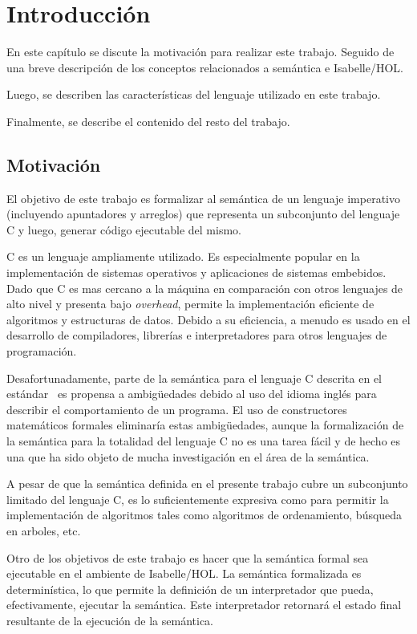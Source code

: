\chapter{Introducción}\label{chapter:introduction}

En este capítulo se discute la motivación para realizar este trabajo.
Seguido de una breve descripción de los conceptos relacionados a semántica e Isabelle/HOL.

Luego, se describen las características del lenguaje utilizado en este trabajo.

Finalmente, se describe el contenido del resto del trabajo.

\section{Motivación}

El objetivo de este trabajo es formalizar al semántica de un lenguaje imperativo (incluyendo apuntadores y arreglos) que representa un subconjunto del lenguaje C y luego, generar código ejecutable del mismo.

C es un lenguaje ampliamente utilizado.
Es especialmente popular en la implementación de sistemas operativos y aplicaciones de sistemas embebidos.
Dado que C es mas cercano a la máquina en comparación con otros lenguajes de alto nivel y presenta bajo \textit{overhead}, permite la implementación eficiente de algoritmos y estructuras de datos.
Debido a su eficiencia, a menudo es usado en el desarrollo de compiladores, librerías e interpretadores para otros lenguajes de programación.

Desafortunadamente, parte de la semántica para el lenguaje C descrita en el estándar~\citep{c99} es propensa a ambigüedades debido al uso del idioma inglés para describir el comportamiento de un programa.
El uso de constructores matemáticos formales eliminaría estas ambigüedades, aunque la formalización de la semántica para la totalidad del lenguaje C no es una tarea fácil y de hecho es una que ha sido objeto de mucha investigación en el área de la semántica.

A pesar de que la semántica definida en el presente trabajo cubre un subconjunto limitado del lenguaje C, es lo suficientemente expresiva como para permitir la implementación de algoritmos tales como algoritmos de ordenamiento, búsqueda en arboles, etc.

Otro de los objetivos de este trabajo es hacer que la semántica formal sea ejecutable en el ambiente de Isabelle/HOL.
La semántica formalizada es determinística, lo que permite la definición de un interpretador que pueda, efectivamente, ejecutar la semántica.
Este interpretador retornará el estado final resultante de la ejecución de la semántica.

